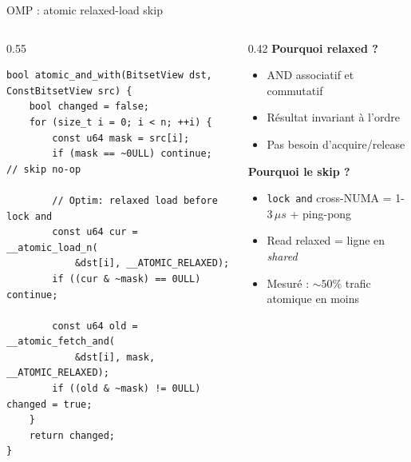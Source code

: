 \documentclass[aspectratio=169,11pt]{beamer}
\begin{document}
\begin{frame}[fragile]{OMP : atomic relaxed-load skip}
\begin{columns}[T]
\begin{column}{0.55\textwidth}
\begin{lstlisting}
bool atomic_and_with(BitsetView dst, ConstBitsetView src) {
    bool changed = false;
    for (size_t i = 0; i < n; ++i) {
        const u64 mask = src[i];
        if (mask == ~0ULL) continue;          // skip no-op

        // Optim: relaxed load before lock and
        const u64 cur = __atomic_load_n(
            &dst[i], __ATOMIC_RELAXED);
        if ((cur & ~mask) == 0ULL) continue;

        const u64 old = __atomic_fetch_and(
            &dst[i], mask, __ATOMIC_RELAXED);
        if ((old & ~mask) != 0ULL) changed = true;
    }
    return changed;
}
\end{lstlisting}
\end{column}
\begin{column}{0.42\textwidth}
\textbf{Pourquoi relaxed ?}
\begin{itemize}
    \item AND associatif et commutatif
    \item Résultat invariant à l'ordre
    \item Pas besoin d'acquire/release
\end{itemize}

\vspace{0.2cm}
\textbf{Pourquoi le skip ?}
\begin{itemize}
    \item \texttt{lock and} cross-NUMA = 1-3\,$\mu s$ + ping-pong
    \item Read relaxed = ligne en \emph{shared}
    \item Mesuré : $\sim 50\%$ trafic atomique en moins
\end{itemize}
\end{column}
\end{columns}
\end{frame}
\end{document}
